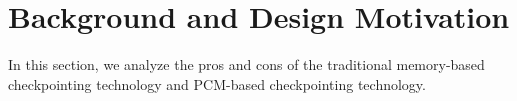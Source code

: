 \documentclass[conference]{IEEEtran}
\begin{document}
\section{Background and Design Motivation}\label{sec:motivation}

In this section, we analyze the pros and cons of the traditional memory-based checkpointing technology and PCM-based checkpointing technology.


%
%
\end{document}
